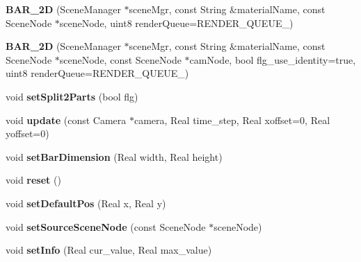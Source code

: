 \begin{DoxyCompactItemize}
\item 
\hypertarget{class_b_a_r__2_d_a48624a469e89e1e7f1fc97c970625432}{
{\bfseries BAR\_\-2D} (SceneManager $\ast$sceneMgr, const String \&materialName, const SceneNode $\ast$sceneNode, uint8 renderQueue=RENDER\_\-QUEUE\_)}
\label{class_b_a_r__2_d_a48624a469e89e1e7f1fc97c970625432}

\item 
\hypertarget{class_b_a_r__2_d_a77690a64f5f5812e740da0e8b8c70f26}{
{\bfseries BAR\_\-2D} (SceneManager $\ast$sceneMgr, const String \&materialName, const SceneNode $\ast$sceneNode, const SceneNode $\ast$camNode, bool flg\_\-use\_\-identity=true, uint8 renderQueue=RENDER\_\-QUEUE\_)}
\label{class_b_a_r__2_d_a77690a64f5f5812e740da0e8b8c70f26}

\item 
\hypertarget{class_b_a_r__2_d_a12428343016baa82ca366c61a13022b7}{
void {\bfseries setSplit2Parts} (bool flg)}
\label{class_b_a_r__2_d_a12428343016baa82ca366c61a13022b7}

\item 
\hypertarget{class_b_a_r__2_d_a4a84a2f27ec6af52221c09d5bf7ecc0d}{
void {\bfseries update} (const Camera $\ast$camera, Real time\_\-step, Real xoffset=0, Real yoffset=0)}
\label{class_b_a_r__2_d_a4a84a2f27ec6af52221c09d5bf7ecc0d}

\item 
\hypertarget{class_b_a_r__2_d_a10161b055e8e0fc0fceda05f8c033a62}{
void {\bfseries setBarDimension} (Real width, Real height)}
\label{class_b_a_r__2_d_a10161b055e8e0fc0fceda05f8c033a62}

\item 
\hypertarget{class_b_a_r__2_d_a4c28db4e1394864e1f2872266f4c8584}{
void {\bfseries reset} ()}
\label{class_b_a_r__2_d_a4c28db4e1394864e1f2872266f4c8584}

\item 
\hypertarget{class_b_a_r__2_d_aa3faa81515db9064ba61983181146f92}{
void {\bfseries setDefaultPos} (Real x, Real y)}
\label{class_b_a_r__2_d_aa3faa81515db9064ba61983181146f92}

\item 
\hypertarget{class_b_a_r__2_d_a30da5a29c71853fb4a5c344c5e83eb92}{
void {\bfseries setSourceSceneNode} (const SceneNode $\ast$sceneNode)}
\label{class_b_a_r__2_d_a30da5a29c71853fb4a5c344c5e83eb92}

\item 
\hypertarget{class_b_a_r__2_d_adb4707f8fd0d3c23f3dca756a04a6975}{
void {\bfseries setInfo} (Real cur\_\-value, Real max\_\-value)}
\label{class_b_a_r__2_d_adb4707f8fd0d3c23f3dca756a04a6975}


\end{DoxyCompactItemize}
